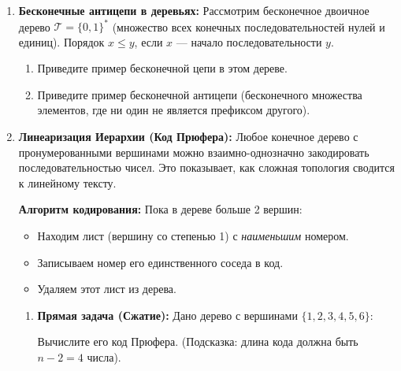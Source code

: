 \documentclass[11pt, a4paper]{extarticle}
\newcommand{\Tcal}{{\mathcal T}}
\renewcommand{\le}{\leqslant}
\begin{document}
\begin{exercise}
\begin{enumerate}
    \item \textbf{Бесконечные антицепи в деревьях:}
        Рассмотрим бесконечное двоичное дерево $\Tcal = \{0, 1\}^*$ (множество всех конечных последовательностей нулей и единиц). Порядок $x \le y$, если $x$ — начало последовательности $y$.
        \begin{enumerate}
            \item Приведите пример бесконечной цепи в этом дереве.
            \item Приведите пример бесконечной антицепи (бесконечного множества элементов, где ни один не является префиксом другого).
        \end{enumerate}
    
        \item \textbf{Линеаризация Иерархии (Код Прюфера):}
    Любое конечное дерево с пронумерованными вершинами можно взаимно-однозначно закодировать последовательностью чисел. Это показывает, как сложная топология сводится к линейному тексту.
    
    \textbf{Алгоритм кодирования:} Пока в дереве больше 2 вершин:
    \begin{itemize}
        \item Находим лист (вершину со степенью 1) с \textit{наименьшим} номером.
        \item Записываем номер его единственного соседа в код.
        \item Удаляем этот лист из дерева.
    \end{itemize}
    
    \begin{enumerate}
        \item \textbf{Прямая задача (Сжатие):} 
        Дано дерево с вершинами $\{1, 2, 3, 4, 5, 6\}$:
        \begin{center}
        \end{center}
        Вычислите его код Прюфера. (Подсказка: длина кода должна быть $n-2 = 4$ числа).
        

\end{enumerate}
\end{enumerate}
\end{exercise}
\end{document}
